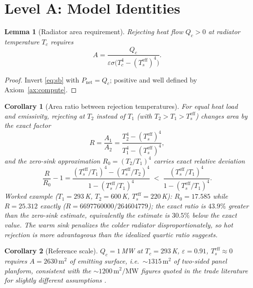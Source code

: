 \documentclass[11pt]{article}
\newtheorem{lemma}{Lemma}
\newtheorem{corollary}{Corollary}
\theoremstyle{definition}
\theoremstyle{remark}
\newcommand{\Tc}{T_c}
\newcommand{\Ts}{T_s^{\mathrm{eff}}}
\newcommand{\eps}{\varepsilon}
\begin{document}
\section{Level A: Model Identities}\label{sec:levelA}

\begin{lemma}[Radiator area requirement]\label{lem:area}
Rejecting heat flow $Q_{c}>0$ at radiator temperature $\Tc$ requires
\begin{equation}
A=\frac{Q_{c}}{\eps\sigma\bigl(\Tc^{4}-(\Ts)^{4}\bigr)}.
\label{eq:area}
\end{equation}
\end{lemma}
\begin{proof}
Invert \eqref{eq:sb} with $P_{\mathrm{net}}=Q_{c}$; positive and well defined by Axiom~\ref{ax:compute}.
\end{proof}

\begin{corollary}[Area ratio between rejection temperatures]\label{cor:ratio}
For equal heat load and emissivity, rejecting at $T_{2}$ instead of $T_{1}$ (with $T_{2}>T_{1}>\Ts$) changes area by the exact factor
\begin{equation}
R=\frac{A_{1}}{A_{2}}=\frac{T_{2}^{4}-(\Ts)^{4}}{T_{1}^{4}-(\Ts)^{4}},
\end{equation}
and the zero-sink approximation $R_{0}=(T_{2}/T_{1})^{4}$ carries exact relative deviation
\begin{equation}
\frac{R}{R_{0}}-1=\frac{(\Ts/T_{1})^{4}-(\Ts/T_{2})^{4}}{1-(\Ts/T_{1})^{4}}
\;<\;\frac{(\Ts/T_{1})^{4}}{1-(\Ts/T_{1})^{4}}.
\end{equation}
\emph{Worked example} ($T_{1}=293$\,K, $T_{2}=600$\,K, $\Ts=220$\,K): $R_{0}=17.585$ while $R=25.312$ exactly ($R=6697760000/264604779$); the exact ratio is $43.9\%$ greater than the zero-sink estimate, equivalently the estimate is $30.5\%$ below the exact value. The warm sink penalizes the colder radiator disproportionately, so hot rejection is \emph{more} advantageous than the idealized quartic ratio suggests.
\end{corollary}

\begin{corollary}[Reference scale]\label{cor:refscale}
$Q_{c}=1\,$MW at $\Tc=293\,$K, $\eps=0.91$, $\Ts\approx0$ requires $A=2630\,\mathrm{m^{2}}$ of emitting surface, i.e.\ ${\sim}1315\,\mathrm{m^{2}}$ of two-sided panel planform, consistent with the ${\sim}1200\,\mathrm{m^{2}/MW}$ figures quoted in the trade literature for slightly different assumptions \cite{eetimes2026}.
\end{corollary}
\end{document}
